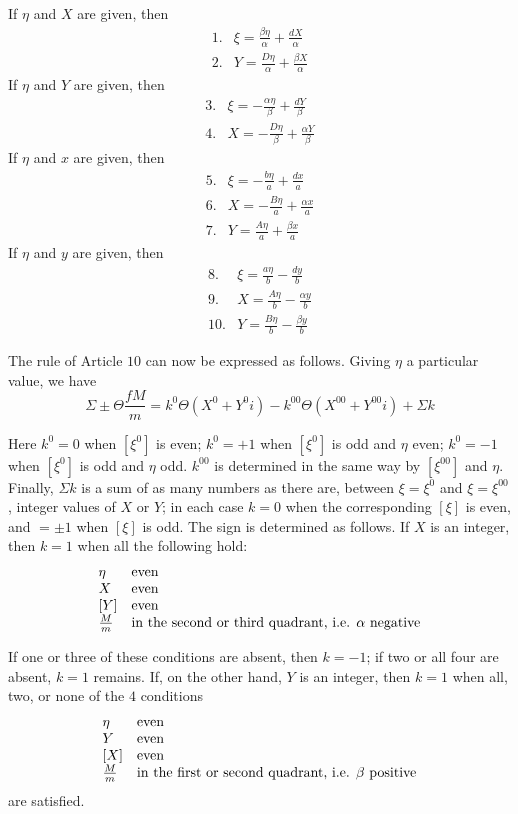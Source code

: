 If $\eta$ and $X$ are given, then
\[
\begin{array}{rl}
1.&\xi=\frac{\beta\eta}{\alpha}+\frac{dX}{\alpha}\\[3pt]
2.&Y=\frac{D\eta}{\alpha}+\frac{\beta X}{\alpha}
\end{array}
\]
If $\eta$ and $Y$ are given, then
\[
\begin{array}{rl}
3.&\xi=-\frac{\alpha\eta}{\beta}+\frac{dY}{\beta}\\[3pt]
4.&X=-\frac{D\eta}{\beta}+\frac{\alpha Y}{\beta}
\end{array}
\]
If $\eta$ and $x$ are given, then
\[
\begin{array}{rl}
5.&\xi=-\frac{b\eta}{a}+\frac{dx}{a}\\[3pt]
6.&X=-\frac{B\eta}{a}+\frac{\alpha x}{a}\\[3pt]
7.&Y=\frac{A\eta}{a}+\frac{\beta x}{a}
\end{array}
\]
If $\eta$ and $y$ are given, then
\[
\begin{array}{rl}
8.&\xi=\frac{a\eta}{b}-\frac{dy}{b}\\[3pt]
9.&X=\frac{A\eta}{b}-\frac{\alpha y}{b}\\[3pt]
10.&Y=\frac{B\eta}{b}-\frac{\beta y}{b}
\end{array}
\]

The rule of Article $10$ can now be expressed as follows. Giving $\eta$ a particular value, we have
\[
\Sigma\pm\Theta\frac{fM}{m}=k^0\Theta(X^0+Y^0i)-k^{00}\Theta(X^{00}+Y^{00}i)+\Sigma k
\]

Here $k^0=0$ when $[\xi^0]$ is even; $k^0=+1$ when $[\xi^0]$ is odd and $\eta$ even; $k^0=-1$ when $[\xi^0]$ is odd and $\eta$ odd. $k^{00}$ is determined in the same way by $[\xi^{00}]$ and $\eta$. Finally, $\Sigma k$ is a sum of as many numbers as there are, between $\xi=\xi^0$ and $\xi=\xi^{00}$, integer values of $X$ or $Y$; in each case $k=0$ when the corresponding $[\xi]$ is even, and $=\pm1$ when $[\xi]$ is odd. The sign is determined as follows. If $X$ is an integer, then $k=1$ when all the following hold:
\[
\begin{array}{ll}
\eta&\text{even}\\
X&\text{even}\\
\relax[Y]&\text{even}\\
\frac{M}{m}&\text{in the second or third quadrant, i.e. }\alpha\text{ negative}
\end{array}
\]

If one or three of these conditions are absent, then $k=-1$; if two or all four are absent, $k=1$ remains. If, on the other hand, $Y$ is an integer, then $k=1$ when all, two, or none of the $4$ conditions
\[
\begin{array}{ll}
\eta&\text{even}\\
Y&\text{even}\\
\relax[X]&\text{even}\\
\frac{M}{m}&\text{in the first or second quadrant, i.e. }\beta\text{ positive}
\end{array}
\]
are satisfied.

